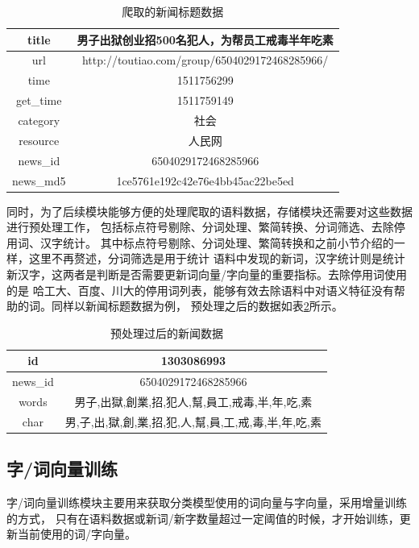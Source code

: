 \documentclass{standalone}
\begin{document}
\begin{table}[h]
    \caption{爬取的新闻标题数据}
    \begin{tabular}{|c|c|}
        \hline
        title & 男子出狱创业招500名犯人，为帮员工戒毒半年吃素 \\
        \hline
        url & http://toutiao.com/group/6504029172468285966/ \\
        \hline
        time & 1511756299 \\
        \hline
        get\_time & 1511759149 \\
        \hline
         category & 社会 \\
        \hline
        resource & 人民网 \\
        \hline
        news\_id & 6504029172468285966 \\
        \hline
        news\_md5 &  1ce5761e192c42e76e4bb45ac22be5ed \\
        \hline
    \end{tabular}
    \label{news_data_table}
    \end{table}

同时，为了后续模块能够方便的处理爬取的语料数据，存储模块还需要对这些数据进行预处理工作，
包括标点符号剔除、分词处理、繁简转换、分词筛选、去除停用词、汉字统计。
其中标点符号剔除、分词处理、繁简转换和之前小节介绍的一样，这里不再赘述，分词筛选是用于统计
语料中发现的新词，汉字统计则是统计新汉字，这两者是判断是否需要更新词向量/字向量的重要指标。去除停用词使用的是
哈工大、百度、川大的停用词列表，能够有效去除语料中对语义特征没有帮助的词。同样以新闻标题数据为例，
预处理之后的数据如表\ref{pretreatment_data_table}所示。
\begin{table}[h]
    \caption{预处理过后的新闻数据}
    \begin{tabular}{|c|c|}
        \hline
        id & 1303086993 \\
        \hline
        news\_id & 6504029172468285966 \\
        \hline
        words & 男子,出獄,創業,招,犯人,幫,員工,戒毒,半,年,吃,素 \\
        \hline
        char & 男,子,出,獄,創,業,招,犯,人,幫,員,工,戒,毒,半,年,吃,素 \\
        \hline
    \end{tabular}
    \label{pretreatment_data_table}
    \end{table}
\subsection{字/词向量训练}
字/词向量训练模块主要用来获取分类模型使用的词向量与字向量，采用增量训练的方式，
只有在语料数据或新词/新字数量超过一定阈值的时候，才开始训练，更新当前使用的词/字向量。
\end{document}

